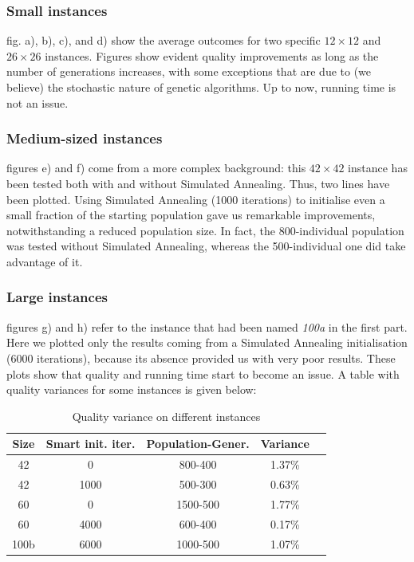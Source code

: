 \documentclass[letterpaper, 10 pt, conference]{ieeeconf}  %
\begin{document}
\subsubsection{Small instances} fig. a), b), c), and d) show
the average outcomes for two specific $12\times12$ and $26\times26$ instances. Figures show evident quality improvements as long as the number of generations increases, with some exceptions that are due to (we believe) the stochastic nature of genetic algorithms. Up to now, running time is not an issue.
\subsubsection{Medium-sized instances} figures e) and f) come from a more complex background: this $42\times42$ instance has been tested both with and without Simulated Annealing. Thus, two lines have been plotted. Using Simulated Annealing (1000 iterations) to initialise even a small fraction of the starting population gave us remarkable improvements, notwithstanding a reduced population size. In fact, the 800-individual population was tested without Simulated Annealing, whereas the 500-individual one did take advantage of it.
\subsubsection{Large instances} figures g) and h) refer to the instance that had been named \textit{100a} in the first part.
Here we plotted only the results coming from a Simulated Annealing initialisation (6000 iterations), because its absence 
provided us with very poor results. These plots show that quality 
and running time start to become an issue.
\newline
A table with quality variances for some instances is given below:
\begin{table}[h]
\caption{Quality variance on different instances}
\label{table_example}
\begin{center}
\begin{tabular}{|c|c|c|c|c|}
\hline
\textbf{Size} & \textbf{Smart init. iter.} & \textbf{Population-Gener.} & \textbf{Variance}\\
\hline
42 &  0 & 800-400 & 1.37\%\\
\hline
42 & 1000 & 500-300 & 0.63\% \\
\hline
60 & 0 & 1500-500 & 1.77\%\\
\hline
60 & 4000 & 600-400 &  0.17\% \\
\hline
100b & 6000 & 1000-500 & 1.07\% \\
\hline
\end{tabular}
\end{center}
\end{table}
\end{document}

